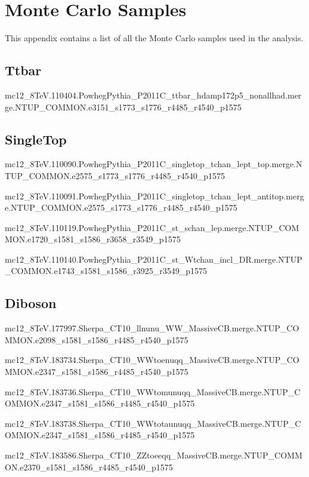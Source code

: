 \clearpage
\section{Monte Carlo Samples}
\label{app:mcSamples}
This appendix contains a list of all the Monte Carlo samples used in the analysis.
\tiny
\subsection{Ttbar}
mc12\_8TeV.110404.PowhegPythia\_P2011C\_ttbar\_hdamp172p5\_nonallhad.merge.NTUP\_COMMON.e3151\_s1773\_s1776\_r4485\_r4540\_p1575

\subsection{SingleTop}
mc12\_8TeV.110090.PowhegPythia\_P2011C\_singletop\_tchan\_lept\_top.merge.NTUP\_COMMON.e2575\_s1773\_s1776\_r4485\_r4540\_p1575

mc12\_8TeV.110091.PowhegPythia\_P2011C\_singletop\_tchan\_lept\_antitop.merge.NTUP\_COMMON.e2575\_s1773\_s1776\_r4485\_r4540\_p1575

mc12\_8TeV.110119.PowhegPythia\_P2011C\_st\_schan\_lep.merge.NTUP\_COMMON.e1720\_s1581\_s1586\_r3658\_r3549\_p1575

mc12\_8TeV.110140.PowhegPythia\_P2011C\_st\_Wtchan\_incl\_DR.merge.NTUP\_COMMON.e1743\_s1581\_s1586\_r3925\_r3549\_p1575


\subsection{Diboson}
mc12\_8TeV.177997.Sherpa\_CT10\_llnunu\_WW\_MassiveCB.merge.NTUP\_COMMON.e2098\_s1581\_s1586\_r4485\_r4540\_p1575

mc12\_8TeV.183734.Sherpa\_CT10\_WWtoenuqq\_MassiveCB.merge.NTUP\_COMMON.e2347\_s1581\_s1586\_r4485\_r4540\_p1575

mc12\_8TeV.183736.Sherpa\_CT10\_WWtomunuqq\_MassiveCB.merge.NTUP\_COMMON.e2347\_s1581\_s1586\_r4485\_r4540\_p1575

mc12\_8TeV.183738.Sherpa\_CT10\_WWtotaunuqq\_MassiveCB.merge.NTUP\_COMMON.e2347\_s1581\_s1586\_r4485\_r4540\_p1575

mc12\_8TeV.183586.Sherpa\_CT10\_ZZtoeeqq\_MassiveCB.merge.NTUP\_COMMON.e2370\_s1581\_s1586\_r4485\_r4540\_p1575

